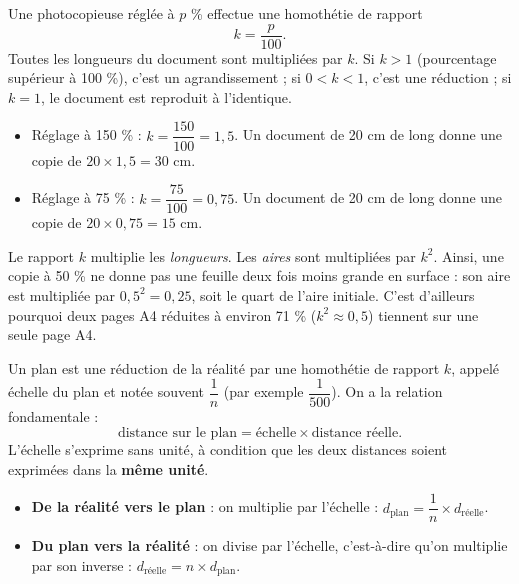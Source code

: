 \documentclass[11pt]{article}
\newcommand{\cle}[1]{{\popxbold\color{popdark}#1}}
\newcounter{popsec}
\newcounter{popsub}
\newcommand{\courssub}[1]{%
  \stepcounter{popsub}%
  \par\vspace{9pt}\noindent{\popxbold\fontsize{11.5}{13}\selectfont\color{popink}{\color{poporange}\thepopsec.\thepopsub}\hspace{6pt}#1}\par\nopagebreak\vspace{4pt}
}
\begin{document}
\begin{definition}
Une photocopieuse réglée à $p$ \% effectue une homothétie de rapport
\[ k = \dfrac{p}{100}. \]
Toutes les longueurs du document sont multipliées par $k$. Si $k>1$ (pourcentage supérieur à 100 \%), c'est un \cle{agrandissement} ; si $0<k<1$, c'est une \cle{réduction} ; si $k=1$, le document est reproduit à l'identique.
\end{definition}

\begin{exemplebox}
\begin{itemize}
\item Réglage à 150 \% : $k = \dfrac{150}{100} = 1,5$. Un document de 20 cm de long donne une copie de $20 \times 1,5 = 30$ cm.
\item Réglage à 75 \% : $k = \dfrac{75}{100} = 0,75$. Un document de 20 cm de long donne une copie de $20 \times 0,75 = 15$ cm.
\end{itemize}
\end{exemplebox}

\begin{attention}
Le rapport $k$ multiplie les \emph{longueurs}. Les \emph{aires} sont multipliées par $k^2$. Ainsi, une copie à 50 \% ne donne pas une feuille \og deux fois moins grande \fg{} en surface : son aire est multipliée par $0,5^2 = 0,25$, soit le quart de l'aire initiale. C'est d'ailleurs pourquoi deux pages A4 réduites à environ 71 \% ($k^2 \approx 0,5$) tiennent sur une seule page A4.
\end{attention}

\courssub{Plans et échelles}

\begin{definition}
Un plan est une réduction de la réalité par une homothétie de rapport $k$, appelé \cle{échelle} du plan et notée souvent $\dfrac{1}{n}$ (par exemple $\dfrac{1}{500}$). On a la relation fondamentale :
\[ \text{distance sur le plan} = \text{échelle} \times \text{distance réelle}. \]
L'échelle s'exprime sans unité, à condition que les deux distances soient exprimées dans la \textbf{même unité}.
\end{definition}

\begin{aretenir}
\begin{itemize}
\item \textbf{De la réalité vers le plan} : on multiplie par l'échelle : $d_{\text{plan}} = \dfrac{1}{n} \times d_{\text{réelle}}$.
\item \textbf{Du plan vers la réalité} : on divise par l'échelle, c'est-à-dire qu'on multiplie par son inverse : $d_{\text{réelle}} = n \times d_{\text{plan}}$.
\end{itemize}
\end{aretenir}
\end{document}
